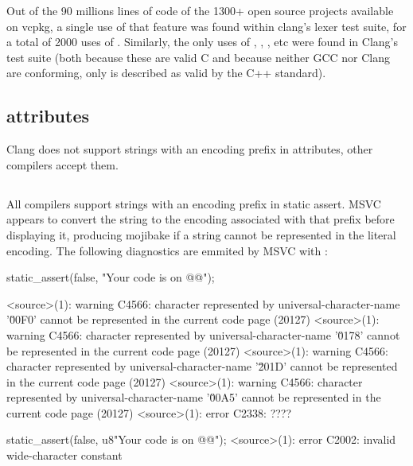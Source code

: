 \documentclass{wg21}
\begin{document}
Out of the 90 millions lines of code of the 1300+ open source projects available on vcpkg, a
single use of that feature was found within clang’s lexer test suite, for a total of 2000 uses
of . Similarly, the only uses of , , , etc were
found in Clang’s test suite (both because these are valid C and because neither GCC nor Clang
are conforming, only  is described as valid by the C++ standard).

\subsection{attributes}

Clang does not support strings with an encoding prefix in attributes, other compilers accept them.

\pagebreak

\subsection{}

All compilers support strings with an encoding prefix in static assert.
MSVC appears to convert the string to the encoding associated with that prefix before displaying it, producing mojibake if a string
cannot be represented in the literal encoding.
The following diagnostics are emmited by MSVC with :
\begin{quoteblock}
\begin{codeblock}
static_assert(false, "Your code is on @@");

<source>(1): warning C4566: character represented by universal-character-name 
'\u00F0'  cannot be represented in the current code page (20127)
<source>(1): warning C4566: character represented by universal-character-name 
'\u0178'  cannot be represented in the current code page (20127)
<source>(1): warning C4566: character represented by universal-character-name 
'\u201D' cannot be represented in the current code page (20127)
<source>(1): warning C4566: character represented by universal-character-name
'\u00A5' cannot be represented in the current code page (20127)
<source>(1): error C2338: ????


static_assert(false, u8"Your code is on @@");
<source>(1): error C2002: invalid wide-character constant
\end{codeblock}
\end{quoteblock}
\end{document}
